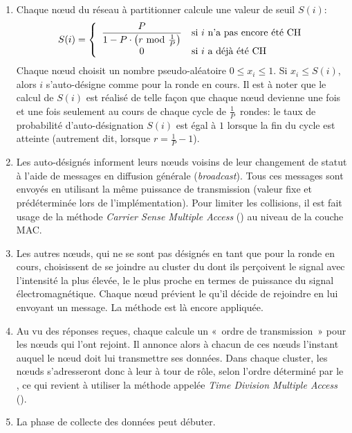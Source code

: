 \begin{enumerate}
    \item Chaque nœud du réseau à partitionner calcule une valeur de seuil $S(i)$:
        \[
            S(i) = \left\{
            \begin{array}{cl}
                \displaystyle \frac{P}{1-P\cdot\left(r\mbox{ mod }\frac{1}{P}\right)} & \mbox{si }i\mbox{ n'a pas encore été \CH}\\
                                                                     0 & \mbox{si }i\mbox{ a déjà été \CH}
            \end{array}
            \right.
        \]
        Chaque nœud choisit un nombre pseudo-aléatoire $0 \le x_{i}\le 1$.
        Si $x_{i} \le S(i)$, alors $i$ s'auto-désigne comme \CH pour la ronde en cours.
        Il est à noter que le calcul de $S(i)$ est réalisé de telle façon que chaque nœud devienne \ch une fois et une fois seulement au cours de chaque cycle de $\frac{1}{P}$~rondes: le taux de probabilité d'auto-désignation $S(i)$ est égal à $1$ lorsque la fin du cycle est atteinte (autrement dit, lorsque $r = \frac{1}{P}-1$).
    \item Les \chs auto-désignés informent leurs nœuds voisins de leur changement de statut à l'aide de messages en diffusion générale (\textit{broadcast}).
        Tous ces messages sont envoyés en utilisant la même puissance de transmission (valeur fixe et prédéterminée lors de l'implémentation).
        Pour limiter les collisions, il est fait usage de la méthode \textit{Carrier Sense Multiple Access} (\csma) au niveau de la couche MAC.
    \item Les autres nœuds, qui ne se sont pas désignés en tant que \chs pour la ronde en cours, choisissent de se joindre au cluster du \CH dont ils perçoivent le signal avec l'intensité la plus élevée, \cad le \CH le plus proche en termes de puissance du signal électromagnétique.
        Chaque nœud prévient le \ch qu'il décide de rejoindre en lui envoyant un message.
        La méthode \csma est là encore appliquée.
    \item Au vu des réponses reçues, chaque \ch calcule un «~ordre de transmission~» pour les nœuds qui l'ont rejoint.
        Il annonce alors à chacun de ces nœuds l'instant auquel le nœud doit lui transmettre ses données.
        Dans chaque cluster, les nœuds s'adresseront donc à leur \ch à tour de rôle, selon l'ordre déterminé par le \CH, ce qui revient à utiliser la méthode appelée \textit{Time Division Multiple Access} (\tdma).
    \item La phase de collecte des données peut débuter.

\end{enumerate}
